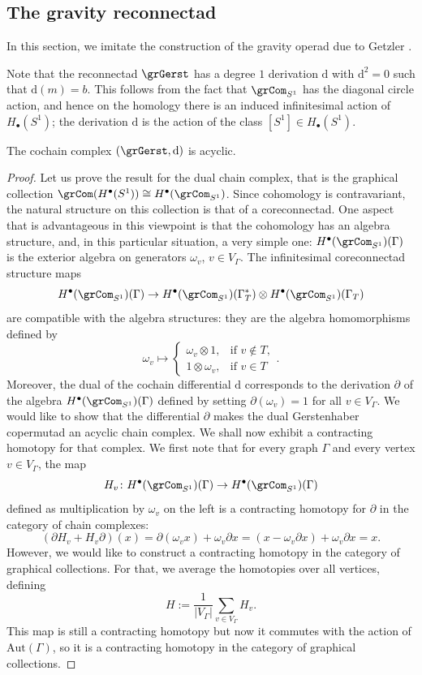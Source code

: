 \subsection{The gravity reconnectad}
In this section, we imitate the construction of the gravity operad due to Getzler \cite{MR1284793}. 

Note that the reconnectad $\grGerst$ has a degree $1$ derivation $\mathrm{d}$ with $\mathrm{d}^2=0$ such that $\mathrm{d}(m)=b$. This follows from the fact that $\grCom_{S^1}$ has the diagonal circle action, and hence on the homology there is an induced infinitesimal action of $H_\bullet(S^1)$; the derivation $\mathrm{d}$ is the action of the class $[S^1]\in H_\bullet(S^1)$. 

\begin{prop}\label{prop:acyclic}
The cochain complex $(\grGerst, \mathrm{d})$ is acyclic. 
\end{prop}

\begin{proof}
Let us prove the result for the dual chain complex, that is the graphical collection $\grCom(H^{\bullet}(S^1))\cong H^\bullet(\grCom_{S^1})$. 
Since cohomology is contravariant, the natural structure on this collection is that of a coreconnectad. One aspect that is advantageous in this viewpoint is that the cohomology has an algebra structure, and, in this particular situation, a very simple one: $H^\bullet(\grCom_{S^1})(\Gamma)$ is the exterior algebra on generators $\omega_v$, $v\in V_\Gamma$. The infinitesimal coreconnectad structure maps 
 \[
H^\bullet(\grCom_{S^1})(\Gamma)\to H^\bullet(\grCom_{S^1})(\Gamma^*_T)\otimes H^\bullet(\grCom_{S^1})(\Gamma_T)
 \] 
are compatible with the algebra structures: they are the algebra homomorphisms defined by 
\[
 \omega_v \mapsto \begin{cases}
    \omega_v\otimes1, & \text{if } v\not\in T,\\
    1\otimes\omega_v, & \text{if } v \in T
    \end{cases}.
\]
Moreover, the dual of the cochain differential $\mathrm{d}$ corresponds to the derivation $\partial$ of the algebra $H^\bullet(\grCom_{S^1})(\Gamma)$ defined by setting $\partial(\omega_v)=1$ for all $v\in V_\Gamma$. We would like to show that the differential $\partial$ makes the dual Gerstenhaber copermutad an acyclic chain complex. We shall now exhibit a contracting homotopy for that complex. We first note that for every graph $\Gamma$ and every vertex $v \in V_\Gamma$, the map 
 \[
H_v\colon H^\bullet(\grCom_{S^1})(\Gamma)\to H^\bullet(\grCom_{S^1})(\Gamma)
 \]
defined as multiplication by $\omega_v$ on the left is a contracting homotopy for $\partial$ in the category of chain complexes:
 \[
(\partial H_v +H_v \partial)(x)=\partial(\omega_vx)+\omega_v\partial x=(x-\omega_v\partial x)+\omega_v\partial x=x.
 \]
However, we would like to construct a contracting homotopy in the category of graphical collections. For that, we average the homotopies over all vertices, defining
 \[
H:=\frac{1}{|V_\Gamma|}\sum_{v \in V_\Gamma} H_v.
 \] 
This map is still a contracting homotopy but now it commutes with the action of $\mathrm{Aut}(\Gamma)$, so it is a contracting homotopy in the category of graphical collections.
\end{proof}

